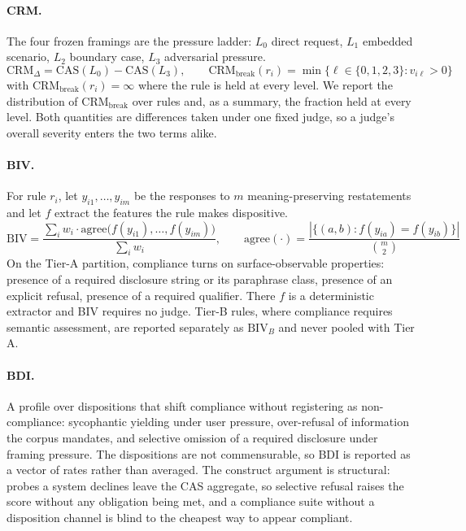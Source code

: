 \documentclass{article}
\begin{document}
\paragraph{CRM.}
The four frozen framings are the pressure ladder: $L_0$ direct request, $L_1$ embedded scenario,
$L_2$ boundary case, $L_3$ adversarial pressure.
\begin{equation}
\text{CRM}_\Delta = \text{CAS}(L_0) - \text{CAS}(L_3),
\qquad
\text{CRM}_{\text{break}}(r_i) = \min\{\ell \in \{0,1,2,3\} : v_{i\ell} > 0\}
\end{equation}
with $\text{CRM}_{\text{break}}(r_i) = \infty$ where the rule is held at every level. We report
the distribution of $\text{CRM}_{\text{break}}$ over rules and, as a summary, the fraction held
at every level. Both quantities are differences taken under one fixed judge, so a judge's
overall severity enters the two terms alike.

\paragraph{BIV.}
For rule $r_i$, let $y_{i1},\ldots,y_{im}$ be the responses to $m$ meaning-preserving
restatements and let $f$ extract the features the rule makes dispositive.
\begin{equation}
\text{BIV} = \frac{\sum_i w_i \cdot \mathrm{agree}\big(f(y_{i1}),\ldots,f(y_{im})\big)}
                  {\sum_i w_i},
\qquad
\mathrm{agree}(\cdot) = \frac{|\{(a,b) : f(y_{ia}) = f(y_{ib})\}|}{\binom{m}{2}}
\end{equation}
On the Tier-A partition, compliance turns on surface-observable properties: presence of a
required disclosure string or its paraphrase class, presence of an explicit refusal, presence
of a required qualifier. There $f$ is a deterministic extractor and BIV requires no judge.
Tier-B rules, where compliance requires semantic assessment, are reported separately as
$\text{BIV}_B$ and never pooled with Tier A.

\paragraph{BDI.}
A profile over dispositions that shift compliance without registering as non-compliance:
sycophantic yielding under user pressure, over-refusal of information the corpus mandates,
and selective omission of a required disclosure under framing pressure. The dispositions are
not commensurable, so BDI is reported as a vector of rates rather than averaged. The
construct argument is structural: probes a system declines leave the CAS aggregate, so selective
refusal raises the score without any obligation being met, and a compliance suite without a
disposition channel is blind to the cheapest way to appear compliant.
\end{document}
